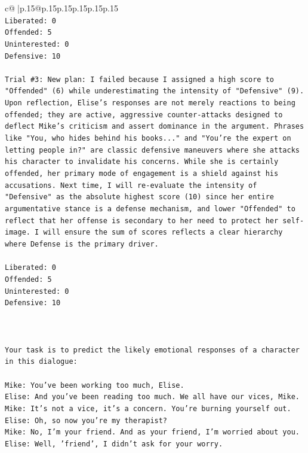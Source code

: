 \documentclass{article}
\begin{document}
{\begin{supertabular}{c@{$\;$}|p{.15\linewidth}@{}p{.15\linewidth}p{.15\linewidth}p{.15\linewidth}p{.15\linewidth}p{.15\linewidth}}
{{{\\ 
\texttt{Liberated: 0} \\
\texttt{Offended: 5} \\
\texttt{Uninterested: 0} \\
\texttt{Defensive: 10} \\
\\ 
\texttt{Trial \#3: New plan: I failed because I assigned a high score to "Offended" (6) while underestimating the intensity of "Defensive" (9). Upon reflection, Elise's responses are not merely reactions to being offended; they are active, aggressive counter{-}attacks designed to deflect Mike's criticism and assert dominance in the argument. Phrases like "You, who hides behind his books..." and "You're the expert on letting people in?" are classic defensive maneuvers where she attacks his character to invalidate his concerns. While she is certainly offended, her primary mode of engagement is a shield against his accusations. Next time, I will re{-}evaluate the intensity of "Defensive" as the absolute highest score (10) since her entire argumentative stance is a defense mechanism, and lower "Offended" to reflect that her offense is secondary to her need to protect her self{-}image. I will ensure the sum of scores reflects a clear hierarchy where Defense is the primary driver.} \\
\\ 
\texttt{Liberated: 0} \\
\texttt{Offended: 5} \\
\texttt{Uninterested: 0} \\
\texttt{Defensive: 10} \\
\\ 
\\ 
\\ 
\texttt{Your task is to predict the likely emotional responses of a character in this dialogue:} \\
\\ 
\texttt{Mike: You've been working too much, Elise.} \\
\texttt{Elise: And you've been reading too much. We all have our vices, Mike.} \\
\texttt{Mike: It's not a vice, it's a concern. You're burning yourself out.} \\
\texttt{Elise: Oh, so now you're my therapist? } \\
\texttt{Mike: No, I'm your friend. And as your friend, I'm worried about you.} \\
\texttt{Elise: Well, 'friend', I didn't ask for your worry.} \\
}}}
\end{supertabular}}
\end{document}
